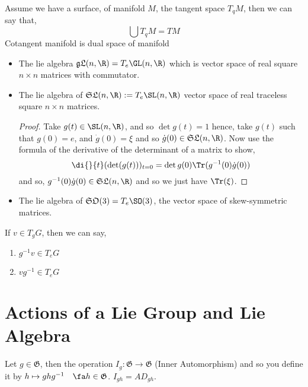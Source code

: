 
\noindent
Assume we have a surface, of manifold $M$, the tangent space $T_qM$, then we can say that,
$$ \bigcup T_qM = TM $$
Cotangent manifold is dual space of manifold\\

\begin{eg}
  \begin{itemize}
    \item The lie algebra $\mathfrak{gL}(n, \R) = T_e\GL(n, \R)$ which is vector space of real square $n \times n$ matrices with commutator.
    \item The lie algebra of $\mathfrak{SL}(n, \R) := T_e \SL(n, \R)$ vector space of real traceless square $n \times n$ matrices.
    \begin{proof}
      Take $g(t) \in \SL(n, \R)$, and so $\det g(t) = 1$ hence, take $g(t)$ such that $g(0) = e$, and $\dot g(0) = \xi$ and so $\dot g(0) \in \mathfrak{SL}(n, \R)$. Now use the formula of the derivative of the determinant of a matrix to show,
      $$ \di {}{t} (\det (g(t)))_{t=0} = \det {g(0)}\Tr(g^{-1}(0)\dot g(0)) $$
      and so, $g^{-1}(0)\dot g(0) \in \mathfrak{SL}(n, \R)$ and so we just have $\Tr (\xi)$.
    \end{proof}
    \item The lie algebra of $\mathfrak{SO}(3) = T_e\SO(3)$, the vector space of skew-symmetric matrices.
  \end{itemize}
\end{eg}

\begin{nlemma}
  If $v \in T_gG$, then we can say,
  \begin{enumerate}
    \item $g^{-1}v \in T_eG$
    \item $vg^{-1} \in T_eG$
  \end{enumerate}
\end{nlemma}

\section{Actions of a Lie Group and Lie Algebra}

\begin{ndefi}
  Let $g \in \mathfrak{G}$, then the operation $I_g : \mathfrak{G} \to \mathfrak{G}$ (Inner Automorphism) and so you define it by $h \mapsto ghg^{-1}\quad\fa h \in \mathfrak{G}$. $I_{gh} = AD_{gh}$.
\end{ndefi}

